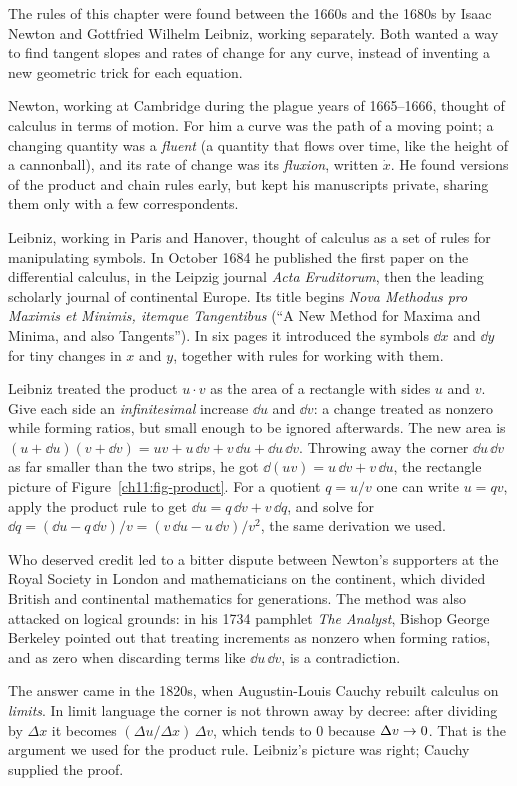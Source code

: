 \begin{historybox}
The rules of this chapter were found between the 1660s and the 1680s by Isaac Newton and Gottfried Wilhelm Leibniz, working separately. Both wanted a way to find tangent slopes and rates of change for any curve, instead of inventing a new geometric trick for each equation.

Newton, working at Cambridge during the plague years of 1665--1666, thought of calculus in terms of motion. For him a curve was the path of a moving point; a changing quantity was a \emph{fluent} (a quantity that flows over time, like the height of a cannonball), and its rate of change was its \emph{fluxion}, written $\dot{x}$. He found versions of the product and chain rules early, but kept his manuscripts private, sharing them only with a few correspondents.

Leibniz, working in Paris and Hanover, thought of calculus as a set of rules for manipulating symbols. In October 1684 he published the first paper on the differential calculus, in the Leipzig journal \emph{Acta Eruditorum}, then the leading scholarly journal of continental Europe. Its title begins \emph{Nova Methodus pro Maximis et Minimis, itemque Tangentibus} (``A New Method for Maxima and Minima, and also Tangents''). In six pages it introduced the symbols $\dd x$ and $\dd y$ for tiny changes in $x$ and $y$, together with rules for working with them.

Leibniz treated the product $u \cdot v$ as the area of a rectangle with sides $u$ and $v$. Give each side an \emph{infinitesimal} increase $\dd u$ and $\dd v$: a change treated as nonzero while forming ratios, but small enough to be ignored afterwards. The new area is $(u + \dd u)(v + \dd v) = uv + u\,\dd v + v\,\dd u + \dd u\,\dd v$. Throwing away the corner $\dd u\,\dd v$ as far smaller than the two strips, he got $\dd(uv) = u\,\dd v + v\,\dd u$, the rectangle picture of Figure~\ref{ch11:fig-product}. For a quotient $q = u/v$ one can write $u = qv$, apply the product rule to get $\dd u = q\,\dd v + v\,\dd q$, and solve for $\dd q = (\dd u - q\,\dd v)/v = (v\,\dd u - u\,\dd v)/v^2$, the same derivation we used.

Who deserved credit led to a bitter dispute between Newton's supporters at the Royal Society in London and mathematicians on the continent, which divided British and continental mathematics for generations. The method was also attacked on logical grounds: in his 1734 pamphlet \emph{The Analyst}, Bishop George Berkeley pointed out that treating increments as nonzero when forming ratios, and as zero when discarding terms like $\dd u\,\dd v$, is a contradiction.

The answer came in the 1820s, when Augustin-Louis Cauchy rebuilt calculus on \emph{limits}. In limit language the corner is not thrown away by decree: after dividing by $\Delta x$ it becomes $(\Delta u/ \Delta x)\,\Delta v$, which tends to $0$ because $\Delta v \to 0$. That is the argument we used for the product rule. Leibniz's picture was right; Cauchy supplied the proof.
\end{historybox}

